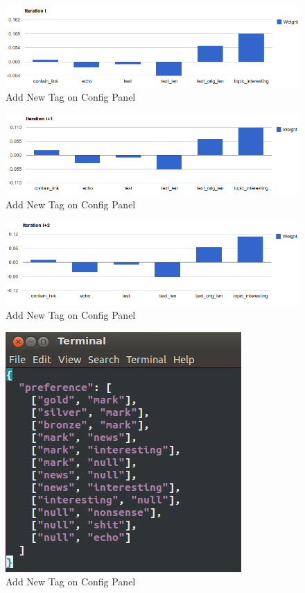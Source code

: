 \documentclass{sig-alternate}
\begin{document}
\begin{figure}[h!]
	\centering
	\includegraphics[width=0.7\linewidth]{../pic/echo_gd_i.png}
	\caption{Add New Tag on Config Panel}
\end{figure}

\begin{figure}[h!]
	\centering
	\includegraphics[width=0.7\linewidth]{../pic/echo_gd_i1.png}
	\caption{Add New Tag on Config Panel}
\end{figure}

\begin{figure}[h!]
	\centering
	\includegraphics[width=0.7\linewidth]{../pic/echo_gd_i2.png}
	\caption{Add New Tag on Config Panel}
\end{figure}

\begin{figure}[h!]
	\centering
	\includegraphics[width=0.7\linewidth]{../pic/echo_preference.png}
	\caption{Add New Tag on Config Panel}
\end{figure}
\end{document}
